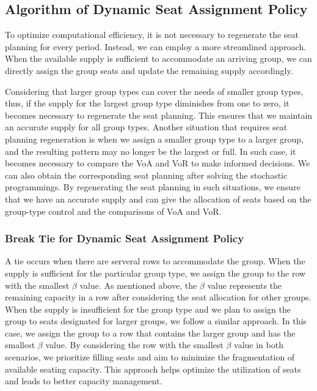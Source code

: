 \subsection{Algorithm of Dynamic Seat Assignment Policy}
To optimize computational efficiency, it is not necessary to regenerate the seat planning for every period. Instead, we can employ a more streamlined approach. When the available supply is sufficient to accommodate an arriving group, we can directly assign the group seats and update the remaining supply accordingly.

Considering that larger group types can cover the needs of smaller group types, thus, if the supply for the largest group type diminishes from one to zero, it becomes necessary to regenerate the seat planning. This ensures that we maintain an accurate supply for all group types.
Another situation that requires seat planning regeneration is when we assign a smaller group type to a larger group, and the resulting pattern may no longer be the largest or full. In such case, it becomes necessary to compare the VoA and VoR to make informed decisions. We can also obtain the corresponding seat planning after solving the stochastic programmings. By regenerating the seat planning in such situations, we ensure that we have an accurate supply and can give the allocation of seats based on the group-type control and the comparisons of VoA and VoR.




\subsubsection*{Break Tie for Dynamic Seat Assignment Policy}
A tie occurs when there are serveral rows to accommodate the group. When the supply is sufficient for the particular group type, we assign the group to the row with the smallest $\beta$ value. As mentioned above, the $\beta$ value represents the remaining capacity in a row after considering the seat allocation for other groups. 
When the supply is insufficient for the group type and we plan to assign the group to seats designated for larger groups, we follow a similar approach. In this case, we assign the group to a row that contains the larger group and has the smallest $\beta$ value. 
By considering the row with the smallest $\beta$ value in both scenarios, we prioritize filling seats and aim to minimize the fragmentation of available seating capacity. This approach helps optimize the utilization of seats and leads to better capacity management.


